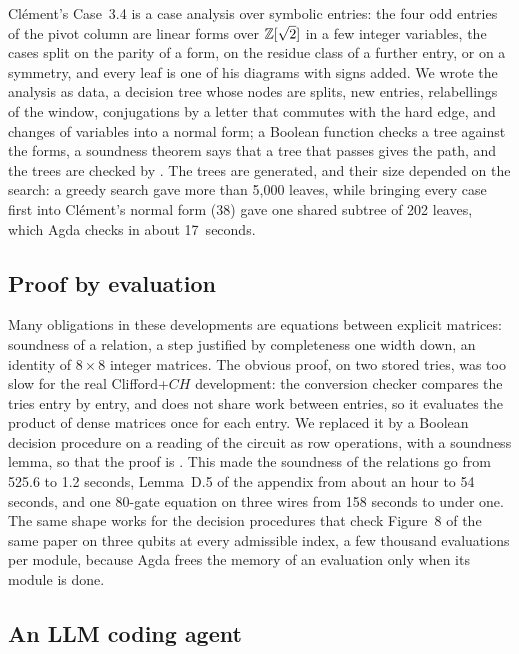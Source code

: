Cl\'ement's Case~3.4 is a case analysis over symbolic entries: the four
odd entries of the pivot column are linear forms over $\mathbb{Z}[\sqrt2]$ in
a few integer variables, the cases split on the parity of a form, on
the residue class of a further entry, or on a symmetry, and every leaf
is one of his diagrams with signs added. We wrote the analysis as
data, a decision tree whose nodes are splits, new entries, relabellings
of the window, conjugations by a letter that commutes with the hard
edge, and changes of variables into a normal form; a Boolean function
checks a tree against the forms, a soundness theorem says that a tree
that passes gives the path, and the trees are checked by .
The trees are generated, and their size depended on the search: a
greedy search gave more than 5{,}000 leaves, while bringing every case
first into Cl\'ement's normal form (38) gave one shared subtree of 202
leaves, which Agda checks in about 17~seconds.

\subsection{Proof by evaluation}\label{sec:eval}

Many obligations in these developments are equations between explicit
matrices: soundness of a relation, a step justified by completeness one
width down, an identity of $8\times8$ integer matrices. The obvious
proof,  on two stored tries, was too slow for the real
Clifford+$CH$ development: the conversion checker compares the tries
entry by entry, and does not share work between entries, so it
evaluates the product of dense matrices once for each entry. We
replaced it by a Boolean decision procedure on a reading of the
circuit as row operations, with a soundness lemma, so that the proof
is . This made the soundness of the
relations go from 525.6 to 1.2 seconds, Lemma~D.5 of the appendix
from about an hour to 54 seconds, and one 80-gate equation on three
wires from 158 seconds to under one. The same shape works for the
decision procedures that check Figure~8 of the same paper on three
qubits at every admissible index, a few thousand evaluations per
module, because Agda frees the memory of an evaluation only when its
module is done.

\subsection{An LLM coding agent}\label{sec:agent}

